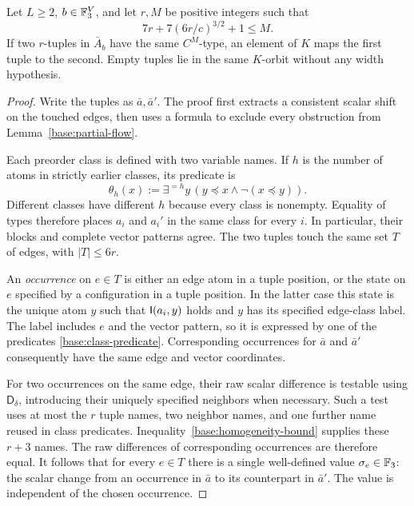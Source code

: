 \begin{proposition}
\label{base:homogeneity}
Let $L\ge2$, $b\in\mathbb F_3^V$, and let $r,M$ be positive integers such that
\begin{equation}
\label{base:homogeneity-bound}
 7r+7(6r/c)^{3/2}+1\le M.
\end{equation}
If two $r$-tuples in $\bar A_b$ have the same $C^M$-type, an element
of $K$ maps the first tuple to the second.  Empty tuples lie in the
same $K$-orbit without any width hypothesis.
\end{proposition}
\begin{proof}
Write the tuples as $\bar a,\bar a'$.  The proof first extracts a
consistent scalar shift on the touched edges, then uses a formula to
exclude every obstruction from Lemma~\ref{base:partial-flow}.

Each preorder class is defined with two variable names.  If $h$ is the
number of atoms in strictly earlier classes, its predicate is
\begin{equation}
\label{base:class-predicate}
 \theta_h(x):=\exists^{=h}y\,
          (y\preceq x\land\neg(x\preceq y)).
\end{equation}
Different classes have different $h$ because every class is nonempty.
Equality of types therefore places $a_i$ and $a_i'$ in the same class
for every $i$.  In particular, their blocks and complete vector
patterns agree.  The two tuples touch the same set $T$ of edges, with
$|T|\le6r$.

An \emph{occurrence} on $e\in T$ is either an edge atom in a tuple
position, or the state on $e$ specified by a configuration in a tuple
position.  In the latter case this state is the unique atom $y$ such
that $\mathsf I(a_i,y)$ holds and $y$ has its specified edge-class label.
The label includes $e$ and the vector pattern, so it is expressed by
one of the predicates \eqref{base:class-predicate}.  Corresponding
occurrences for $\bar a$ and $\bar a'$ consequently have the same
edge and vector coordinates.

For two occurrences on the same edge, their raw scalar difference is
testable using $\mathsf D_\delta$, introducing their uniquely specified
neighbors when necessary.  Such a test uses at most the $r$ tuple
names, two neighbor names, and one further name reused in class
predicates.  Inequality~\eqref{base:homogeneity-bound} supplies these
$r+3$ names.  The raw differences of corresponding occurrences are
therefore equal.  It follows that for every $e\in T$ there is a single
well-defined value $\sigma_e\in\mathbb F_3$: the scalar change from an
occurrence in $\bar a$ to its counterpart in $\bar a'$.  The value is
independent of the chosen occurrence.


\end{proof}
